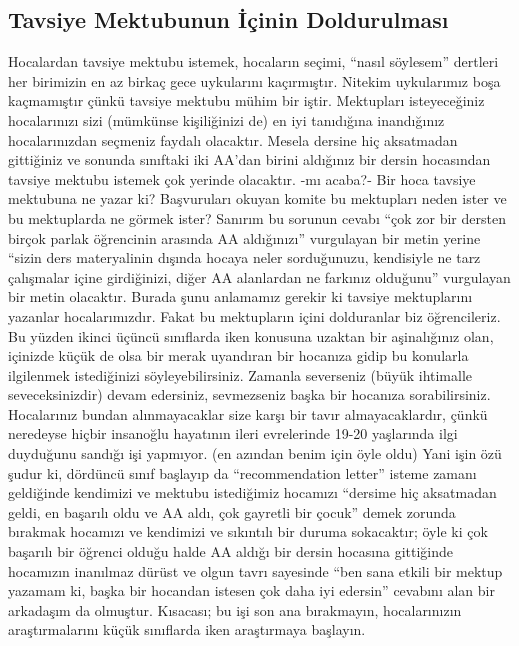 \documentclass[12pt]{article}
\begin{document}
\subsection{Tavsiye Mektubunun İçinin Doldurulması}
Hocalardan tavsiye mektubu istemek, hocaların seçimi, “nasıl söylesem” dertleri her birimizin en az birkaç gece uykularını kaçırmıştır. Nitekim uykularımız boşa kaçmamıştır çünkü tavsiye mektubu mühim bir iştir. Mektupları isteyeceğiniz hocalarınızı sizi (mümkünse kişiliğinizi de) en iyi tanıdığına inandığınız hocalarınızdan seçmeniz faydalı olacaktır. Mesela dersine hiç aksatmadan gittiğiniz ve sonunda sınıftaki iki AA’dan birini aldığınız bir dersin hocasından tavsiye mektubu istemek çok yerinde olacaktır. -mı acaba?- Bir hoca tavsiye mektubuna ne yazar ki? Başvuruları okuyan komite bu mektupları neden ister ve bu mektuplarda ne görmek ister? Sanırım bu sorunun cevabı “çok zor bir dersten birçok parlak öğrencinin arasında AA aldığınızı” vurgulayan bir metin yerine “sizin ders materyalinin dışında hocaya neler sorduğunuzu, kendisiyle ne tarz çalışmalar içine girdiğinizi, diğer AA alanlardan ne farkınız olduğunu” vurgulayan bir metin olacaktır. Burada şunu anlamamız gerekir ki tavsiye mektuplarını yazanlar hocalarımızdır. Fakat bu mektupların içini dolduranlar biz öğrencileriz. Bu yüzden ikinci üçüncü sınıflarda iken konusuna uzaktan bir aşinalığınız olan, içinizde küçük de olsa bir merak uyandıran bir hocanıza gidip bu konularla ilgilenmek istediğinizi söyleyebilirsiniz. Zamanla severseniz (büyük ihtimalle seveceksinizdir) devam edersiniz, sevmezseniz başka bir hocanıza sorabilirsiniz. Hocalarınız bundan alınmayacaklar size karşı bir tavır almayacaklardır, çünkü neredeyse hiçbir insanoğlu hayatının ileri evrelerinde 19-20 yaşlarında ilgi duyduğunu sandığı işi yapmıyor. (en azından benim için öyle oldu) Yani işin özü şudur ki, dördüncü sınıf başlayıp da “recommendation letter” isteme zamanı geldiğinde kendimizi ve mektubu istediğimiz hocamızı “dersime hiç aksatmadan geldi, en başarılı oldu ve AA aldı, çok gayretli bir çocuk” demek zorunda bırakmak hocamızı ve kendimizi ve sıkıntılı bir duruma sokacaktır; öyle ki çok başarılı bir öğrenci olduğu halde AA aldığı bir dersin hocasına gittiğinde hocamızın inanılmaz dürüst ve olgun tavrı sayesinde “ben sana etkili bir mektup yazamam ki, başka bir hocandan istesen çok daha iyi edersin” cevabını alan bir arkadaşım da olmuştur. Kısacası; bu işi son ana bırakmayın, hocalarınızın araştırmalarını küçük sınıflarda iken araştırmaya başlayın.
\end{document}
